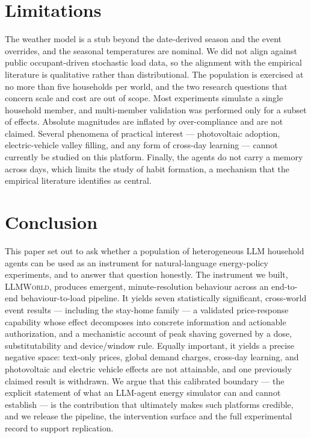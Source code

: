 \documentclass[11pt]{article}
\begin{document}
\section{Limitations}
The weather model is a stub beyond the date-derived season and the event overrides, and the seasonal
temperatures are nominal. We did not align against public occupant-driven stochastic load data, so the
alignment with the empirical literature is qualitative rather than distributional. The population is
exercised at no more than five households per world, and the two research questions that concern scale and
cost are out of scope. Most experiments simulate a single household member, and multi-member validation
was performed only for a subset of effects. Absolute magnitudes are inflated by over-compliance and are
not claimed. Several phenomena of practical interest --- photovoltaic adoption, electric-vehicle valley
filling, and any form of cross-day learning --- cannot currently be studied on this platform. Finally, the
agents do not carry a memory across days, which limits the study of habit formation, a mechanism that the
empirical literature identifies as central.

\section{Conclusion}
This paper set out to ask whether a population of heterogeneous LLM household agents can be used as an
instrument for natural-language energy-policy experiments, and to answer that question honestly. The
instrument we built, \textsc{LLMWorld}, produces emergent, minute-resolution behaviour across an
end-to-end behaviour-to-load pipeline. It yields seven statistically significant, cross-world event
results --- including the stay-home family --- a validated price-response capability whose effect
decomposes into concrete information and actionable authorization, and a mechanistic account of peak
shaving governed by a dose, substitutability and device/window rule. Equally important, it yields a
precise negative space: text-only prices, global demand charges, cross-day learning, and photovoltaic and
electric vehicle effects are not attainable, and one previously claimed result is withdrawn. We argue
that this calibrated boundary --- the explicit statement of what an LLM-agent energy simulator can and
cannot establish --- is the contribution that ultimately makes such platforms credible, and we release
the pipeline, the intervention surface and the full experimental record to support replication.
\end{document}
